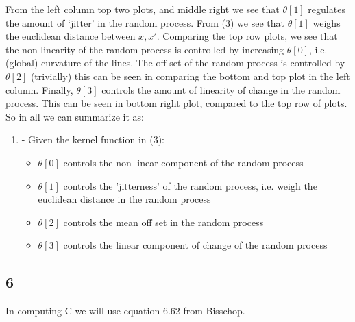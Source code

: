 \documentclass[11pt]{article}
\begin{document}
From the left column top two plots, and middle right we see that
\(\theta[1]\) regulates the amount of `jitter' in the random process.
From (3) we see that \(\theta[1]\) weighs the euclidean distance between
\(x, x'\). Comparing the top row plots, we see that the non-linearity of
the random process is controlled by increasing \(\theta[0]\), i.e.
(global) curvature of the lines. The off-set of the random process is
controlled by \(\theta[2]\) (trivially) this can be seen in comparing
the bottom and top plot in the left column. Finally, \(\theta[3]\)
controls the amount of linearity of change in the random process. This
can be seen in bottom right plot, compared to the top row of plots. So
in all we can summarize it as:

\begin{enumerate}
  \item - Given the kernel function in (3):
  \begin{itemize}
  \item  $\theta[0]$ controls the non-linear component of the random process

  \item  $\theta[1]$ controls the 'jitterness' of the random process, i.e. weigh the euclidean distance in the random process

  \item $\theta[2]$ controls the mean off set in the random process

  \item $\theta[3]$ controls the linear component of change of the random process
  \end{itemize}
\end{enumerate}

    \subsection{6}\label{section}

    In computing C we will use equation 6.62 from Bisschop.
\end{document}
